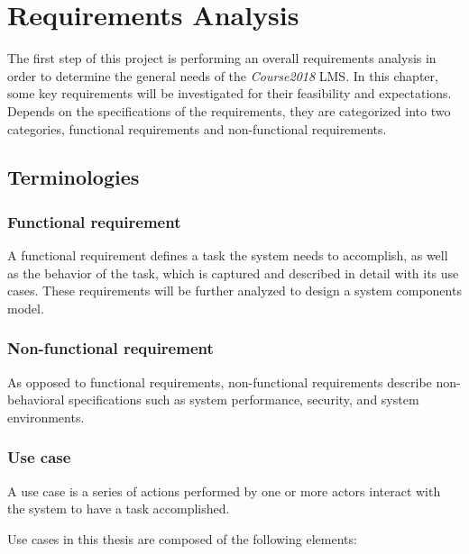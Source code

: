 

\chapter{Requirements Analysis}
\label{chap:REQS}

The first step of this project is performing an overall requirements analysis
in order to determine the general needs of the \emph{Course2018} LMS.
In this chapter, some key requirements will be investigated for their
feasibility and expectations.
Depends on the specifications of the requirements, they are categorized into
two categories, functional requirements and non-functional requirements.

\section{Terminologies}

\subsection{Functional requirement}
A functional requirement defines a task the system needs to accomplish,
as well as the behavior of the task, which is captured and described in detail
with its use cases.
These requirements will be further analyzed to design a system components
model.~\cite{functionalReqs}

\subsection{Non-functional requirement}
As opposed to functional requirements, non-functional requirements describe
non-behavioral specifications such as system performance, security, and system
environments.

\subsection{Use case}
A use case is a series of actions performed by one or more actors interact
with the system to have a task accomplished. \cite{useCase}

\medskip 

Use cases in this thesis are composed of the following elements:

